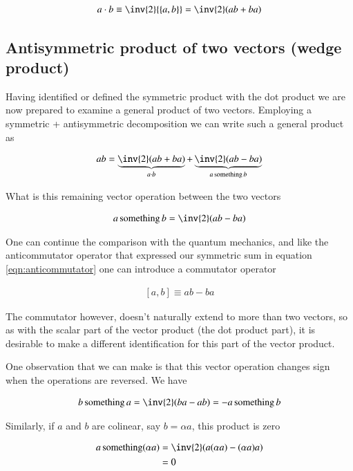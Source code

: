 \documentclass{article}
\newcommand{\symmetric}[2]{{\left\{{#1},{#2}\right\}}}
\newcommand{\antisymmetric}[2]{\left[{#1},{#2}\right]}
\DeclareMathOperator{\something}{something}
\begin{document}
\begin{align}\label{eqn:dotDefined}
a \cdot b \equiv \inv{2} \symmetric{a}{b} = \inv{2} (a b + ba)
\end{align}

\subsection{ Antisymmetric product of two vectors (wedge product) }

Having identified or defined the symmetric product with the dot product we are now prepared to examine a general product of two vectors.  Employing a symmetric + antisymmetric decomposition we can write such a general product as

\begin{align*}
a b = \underbrace{\inv{2}(a b + b a)}_{a \cdot b} + \underbrace{ \inv{2} ( a b - b a ) }_{ a \something b }
\end{align*}

What is this remaining vector operation between the two vectors

\begin{align*}
a \something b = \inv{2} ( a b - b a )
\end{align*}

One can continue the comparison with the quantum mechanics, and like the
anticommutator operator that expressed our symmetric sum in equation
\ref{eqn:anticommutator} one can introduce a commutator operator

\begin{align}\label{eqn:commutator}
\antisymmetric{a}{b} \equiv a b - b a
\end{align}

The commutator however, doesn't naturally extend to more than two vectors, so
as with the scalar part of the vector product (the dot product part), 
it is desirable to make a different identification for this part of the vector
product.

One observation that we can make is that this vector operation changes sign when the operations are reversed.  We have

\begin{align*}
b \something a = \inv{2} ( b a - a b) = - a \something b
\end{align*}

Similarly, if $a$ and $b$ are colinear, say $b = \alpha a$, this product is zero

\begin{align*}
a \something (\alpha a)
&= \inv{2} ( a  (\alpha a) - (\alpha a) a ) \\
&= 0
\end{align*}
\end{document}
